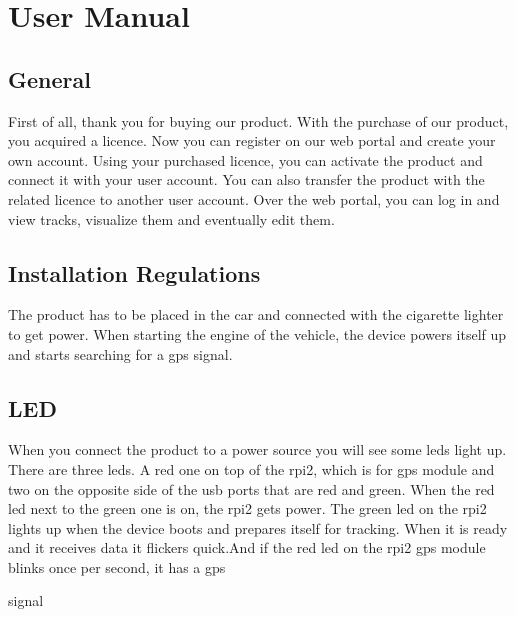 \chapter{User Manual}
\section{General}
First of all, thank you for buying our product. With the purchase of our product, you acquired a licence. Now you can register on our web portal and create your own account. Using your purchased licence, you can activate the product and connect it with your user account. You can also transfer the product with the related licence to another user account. Over the web portal, you can log in and view tracks, visualize them and eventually edit them.
\section{Installation Regulations}
The product has to be placed in the car and connected with the cigarette lighter to get power. When starting the engine of the vehicle, the device powers itself up and starts searching for a \gls{gps} signal.
\section{LED}
When you connect the product to a power source you will see some \gls{led}s light up.
There are three \gls{led}s. A red one on top of the \gls{rpi2}, which is for \gls{gps} module and two on the opposite side of the \gls{usb} ports that are red and green.
When the red \gls{led} next to the green one is on, the \gls{rpi2} gets power.
The green \gls{led} on the \gls{rpi2} lights up when the device boots and prepares itself for tracking. When it is ready and it receives data it flickers quick.\clearpageauthor {}And if the red \gls{led} on the \gls{rpi2} \gls{gps} module blinks once per second, it has a \gls{gps} 

signal

